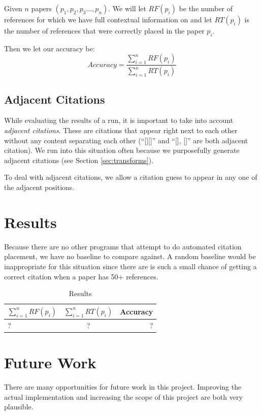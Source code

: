 \documentclass[10pt, conference, compsocconf]{IEEEtran}
\begin{document}
Given $n$ papers $(p_{1}, p_{2}, p_{3} ..., p_{n})$. We will let $RF(p_{i})$ be the number of references
for which we have full contextual information on and let $RT(p_{i})$ is the number of references
that were correctly placed in the paper $p_{i}$.

Then we let our accuracy be:
$$Accuracy = \frac{\sum_{i = 1}^{n} RF(p_{i})}{\sum_{i = 1}^{n} RT(p_{i})}$$

\subsection{Adjacent Citations}
While evaluating the results of a run, it is important to take into account \textit{adjacent citations}.
These are citations that appear right next to each other without any content separating each other (``[][]'' and ``[], []''
are both adjacent citation). We run into this situation often because we purposefully generate adjacent citations (see
Section \ref{sec:transforms}).

To deal with adjacent citations, we allow a citation guess to appear in any one of the adjacent positions.

\section{Results}\label{sec:results}
Because there are no other programs that attempt to do automated citation placement, we have no baseline to compare against.
A random baseline would be inappropriate for this situation since there are is such a small chance of getting a correct
citation when a paper has 50+ references.

\begin{table}[H]
\centering
\begin{tabular} { l | c | r }
\hline\hline
        {\bf $\sum_{i = 1}^{n} RF(p_{i})$} & {\bf $\sum_{i = 1}^{n} RT(p_{i})$} & {\bf Accuracy} \\[0.5ex]
\hline
        ? & ? & ? \\[0.5ex]
\end{tabular}
\caption{Results}
\label{tab:results}
\end{table}

\section{Future Work}\label{sec:future}
There are many opportunities for future work in this project.
Improving the actual implementation and increasing the scope of this project are both very plausible.
\end{document}
